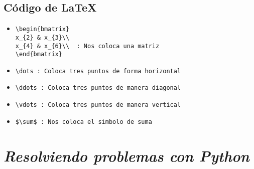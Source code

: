 \documentclass{book}
\begin{document}
	\subsection {Código de \LaTeX}
	\begin{itemize}
		\item 
		\begin{lstlisting}
\begin{bmatrix}
x_{2} & x_{3}\\
x_{4} & x_{6}\\  : Nos coloca una matriz
\end{bmatrix}
		\end{lstlisting}
		\item 
		\begin{lstlisting}
\dots : Coloca tres puntos de forma horizontal
		\end{lstlisting}
		\item 
		\begin{lstlisting}
\ddots : Coloca tres puntos de manera diagonal
		\end{lstlisting}
		\item 
		\begin{lstlisting}
\vdots : Coloca tres puntos de manera vertical
		\end{lstlisting}
		
		
		\item 
		\begin{lstlisting}
$\sum$ : Nos coloca el simbolo de suma
		\end{lstlisting}
		
		
	\end{itemize}	
	
	
	
	





	\section{\textit{Resolviendo problemas con Python}}%
\begin{flushright}
	\date{17 de enero de 2019}
\end{flushright}

\end{document}
